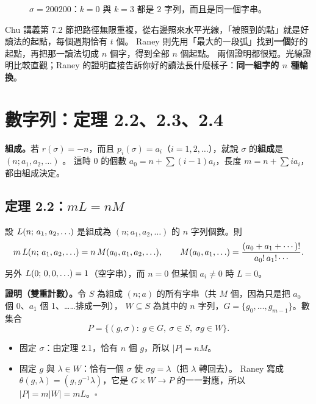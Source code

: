 \begin{figure}[H]
\centering
\RanCycThree
\caption{$\sigma=200200$：$k=0$ 與 $k=3$ 都是 2 字列，而且是同一個字串。}
\label{fig:cyc3}
\end{figure}

\begin{notebox}
Chu 講義第 7.2 節把路徑無限重複，從右邊照來水平光線，「被照到的點」就是好讀法的起點，每個週期恰有 $t$ 個。
Raney 則先用「最大的一段弧」找到\textbf{一個}好的起點，再把那一讀法切成 $n$ 個字，得到全部 $n$ 個起點。
兩個證明都很短。光線證明比較直觀；Raney 的證明直接告訴你好的讀法長什麼樣子：\textbf{同一組字的 $n$ 種輪換}。
\end{notebox}

\section{數字列：定理 2.2、2.3、2.4}\label{sec:count}

\textbf{組成。}若 $r(\sigma)=-n$，而且 $p_i(\sigma)=a_i$（$i=1,2,\ldots$），就說 $\sigma$ 的\textbf{組成}是 $(n;a_1,a_2,\ldots)$ 。
這時 0 的個數 $a_0=n+\sum(i-1)a_i$，長度 $m=n+\sum ia_i$，都由組成決定。

\subsection{定理 2.2：$mL=nM$}

\begin{thmbox}[定理 2.2 \paper{p.~443}]
設 $L(n;\,a_1,a_2,\ldots)$ 是組成為 $(n;a_1,a_2,\ldots)$ 的 $n$ 字列個數。則
\[
m\,L(n;\,a_1,a_2,\ldots)=n\,M(a_0,a_1,a_2,\ldots),\qquad M(a_0,a_1,\ldots)=\frac{(a_0+a_1+\cdots)!}{a_0!\,a_1!\cdots}.
\]
另外 $L(0;\,0,0,\ldots)=1$（空字串），而 $n=0$ 但某個 $a_i\neq0$ 時 $L=0$。
\end{thmbox}

\textbf{證明（雙重計數）。}令 $S$ 為組成 $(n;a)$ 的所有字串（共 $M$ 個，因為只是把 $a_0$ 個 0、$a_1$ 個 1、……排成一列），
$W\subseteq S$ 為其中的 $n$ 字列，$G=\{g_0,\ldots,g_{m-1}\}$。數集合
\[
P=\{(g,\sigma):\ g\in G,\ \sigma\in S,\ \sigma g\in W\}.
\]
\begin{itemize}
  \item 固定 $\sigma$：由定理 2.1，恰有 $n$ 個 $g$，所以 $|P|=nM$。
  \item 固定 $g$ 與 $\lambda\in W$：恰有一個 $\sigma$ 使 $\sigma g=\lambda$（把 $\lambda$ 轉回去）。
        Raney 寫成 $\theta(g,\lambda)=(g,g^{-1}\lambda)$，它是 $G\times W\to P$ 的一一對應，所以 $|P|=m|W|=mL$。\hfill$\square$
\end{itemize}

